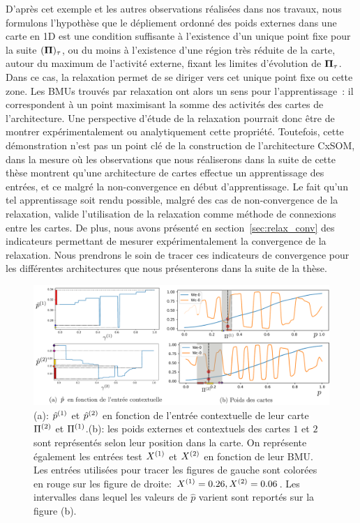 \documentclass[../main]{subfiles}
\begin{document}
D'après cet exemple et les autres observations réalisées dans nos travaux, nous formulons l'hypothèse que le dépliement ordonné des poids externes dans une carte en 1D est une condition suffisante à l'existence d'un unique point fixe pour la suite $(\mathbf{\Pi})_\tau$, ou du moins à l'existence d'une région très réduite de la carte, autour du maximum de l'activité externe, fixant les limites d'évolution de $\mathbf{\Pi}_\tau$.
Dans ce cas, la relaxation permet de se diriger vers cet unique point fixe ou cette zone.
Les BMUs trouvés par relaxation ont alors un sens pour l'apprentissage~: il correspondent à un point maximisant la somme des activités des cartes de l'architecture.
Une perspective d'étude de la relaxation pourrait donc être de montrer expérimentalement ou analytiquement cette propriété. 
Toutefois, cette démonstration n'est pas un point clé de la construction de l'architecture CxSOM, dans la mesure où les observations que nous réaliserons dans la suite de cette thèse montrent qu'une architecture de cartes effectue un apprentissage des entrées, et ce malgré la non-convergence en début d'apprentissage. 
Le fait qu'un tel apprentissage soit rendu possible, malgré des cas de non-convergence de la relaxation, valide l'utilisation de la relaxation comme méthode de connexions entre les cartes. 
De plus, nous avons présenté en section~\ref{sec:relax_conv} des indicateurs permettant de mesurer expérimentalement la convergence de la relaxation. Nous prendrons le soin de tracer ces indicateurs de convergence pour les différentes architectures que nous présenterons dans la suite de la thèse.


\begin{figure}
	\includegraphics[width=\textwidth]{am_w_006_noinp}
	\caption{(a): $\hat{p}^{({1})}$ et $\hat{p}^{({2})}$ en fonction de l'entrée contextuelle de leur carte $\Pi^{({2})}$ et $\Pi^{({1})}$.(b): les poids externes et contextuels des cartes $1$ et $2$ sont représentés selon leur position dans la carte. On représente également les entrées test $X^{({1})}$ et $X^{({2})}$ en fonction de leur BMU. Les entrées utilisées pour tracer les figures de gauche sont colorées en rouge sur les figure de droite: $X^{({1})}=0.26,X^{({2})}=0.06$. Les intervalles dans lequel les valeurs de $\hat{p}$ varient sont reportés sur la figure (b).}
	\label{fig:w006}
	\end{figure}
\end{document}
